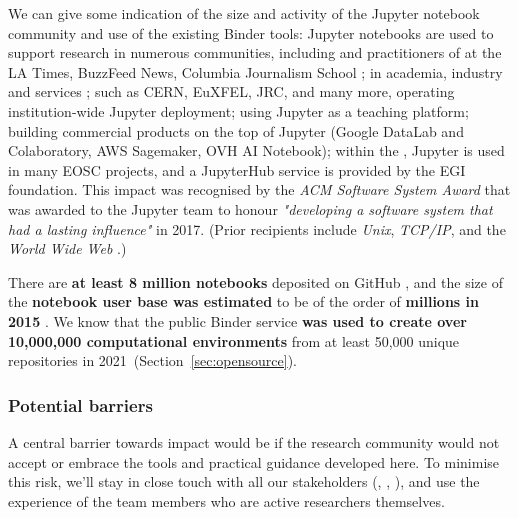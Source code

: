 \medskip

We can give some indication of the size and activity of the Jupyter notebook
community and use of the existing Binder tools: Jupyter notebooks are used to
support research in numerous communities, including
{} and practitioners of  at the LA Times, BuzzFeed News, Columbia Journalism School
\cite{latimes-datadesk} \cite{columbia-nytimes} \cite{data-journalism};
 in academia, industry and services \cite{Perkel2018};
{} such as CERN, EuXFEL, JRC, and many more,
operating institution-wide Jupyter deployment;
{} using Jupyter as a teaching platform;
{} building commercial products on the
top of Jupyter (Google DataLab and Colaboratory, AWS Sagemaker, OVH AI Notebook);
within the , Jupyter is used in many EOSC
projects, and a JupyterHub service is provided by the EGI foundation.
This impact was recognised by the \emph{ACM Software System Award} that was
awarded to the Jupyter team to honour \emph{"developing a software system that
had a lasting influence"} in 2017. (Prior recipients include \emph{Unix},
\emph{TCP/IP}, and the \emph{World Wide Web} \cite{acm-award}.)

There are \textbf{at least 8 million notebooks} deposited on GitHub \cite{notebookcount}, and
the size of the \textbf{notebook user base was estimated} to be of the order of
\textbf{millions in 2015} \cite{jupyter-grant}. We know that the public Binder service \textbf{\mybinder{}
was used to create over 10,000,000 computational environments}
from at least 50,000 unique repositories in 2021~(Section~\ref{sec:opensource}).


\subsubsection{Potential barriers}

A central barrier towards impact would be if the research community would not
accept or embrace the tools and practical guidance developed here.
To minimise this risk, we'll stay in close touch with all our stakeholders
(, , ), and use
the experience of the team members who are active researchers themselves.

